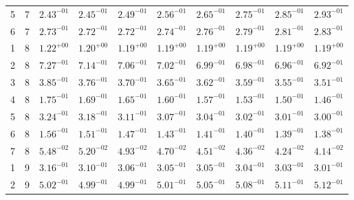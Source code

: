 \begin{table}
\begin{tabular}{c c c c c c c c c c}
   5 &    7 & $ 2.43^{-01}$ & $ 2.45^{-01}$ & $ 2.49^{-01}$ & $ 2.56^{-01}$ & $ 2.65^{-01}$ & $ 2.75^{-01}$ & $ 2.85^{-01}$ & $ 2.93^{-01}$ \\%
   6 &    7 & $ 2.73^{-01}$ & $ 2.72^{-01}$ & $ 2.72^{-01}$ & $ 2.74^{-01}$ & $ 2.76^{-01}$ & $ 2.79^{-01}$ & $ 2.81^{-01}$ & $ 2.83^{-01}$ \\%
   1 &    8 & $ 1.22^{+00}$ & $ 1.20^{+00}$ & $ 1.19^{+00}$ & $ 1.19^{+00}$ & $ 1.19^{+00}$ & $ 1.19^{+00}$ & $ 1.19^{+00}$ & $ 1.19^{+00}$ \\%
   2 &    8 & $ 7.27^{-01}$ & $ 7.14^{-01}$ & $ 7.06^{-01}$ & $ 7.02^{-01}$ & $ 6.99^{-01}$ & $ 6.98^{-01}$ & $ 6.96^{-01}$ & $ 6.92^{-01}$ \\%
   3 &    8 & $ 3.85^{-01}$ & $ 3.76^{-01}$ & $ 3.70^{-01}$ & $ 3.65^{-01}$ & $ 3.62^{-01}$ & $ 3.59^{-01}$ & $ 3.55^{-01}$ & $ 3.51^{-01}$ \\%
   4 &    8 & $ 1.75^{-01}$ & $ 1.69^{-01}$ & $ 1.65^{-01}$ & $ 1.60^{-01}$ & $ 1.57^{-01}$ & $ 1.53^{-01}$ & $ 1.50^{-01}$ & $ 1.46^{-01}$ \\%
   5 &    8 & $ 3.24^{-01}$ & $ 3.18^{-01}$ & $ 3.11^{-01}$ & $ 3.07^{-01}$ & $ 3.04^{-01}$ & $ 3.02^{-01}$ & $ 3.01^{-01}$ & $ 3.00^{-01}$ \\%
   6 &    8 & $ 1.56^{-01}$ & $ 1.51^{-01}$ & $ 1.47^{-01}$ & $ 1.43^{-01}$ & $ 1.41^{-01}$ & $ 1.40^{-01}$ & $ 1.39^{-01}$ & $ 1.38^{-01}$ \\%
   7 &    8 & $ 5.48^{-02}$ & $ 5.20^{-02}$ & $ 4.93^{-02}$ & $ 4.70^{-02}$ & $ 4.51^{-02}$ & $ 4.36^{-02}$ & $ 4.24^{-02}$ & $ 4.14^{-02}$ \\%
   1 &    9 & $ 3.16^{-01}$ & $ 3.10^{-01}$ & $ 3.06^{-01}$ & $ 3.05^{-01}$ & $ 3.05^{-01}$ & $ 3.04^{-01}$ & $ 3.03^{-01}$ & $ 3.01^{-01}$ \\%
   2 &    9 & $ 5.02^{-01}$ & $ 4.99^{-01}$ & $ 4.99^{-01}$ & $ 5.01^{-01}$ & $ 5.05^{-01}$ & $ 5.08^{-01}$ & $ 5.11^{-01}$ & $ 5.12^{-01}$ \\%

\end{tabular}
\end{table}
